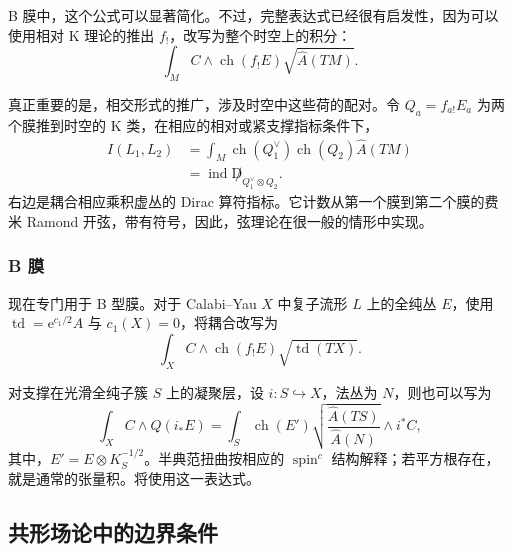 B 膜中，这个公式可以显著简化。不过，完整表达式已经很有启发性，因为可以使用相对 K 理论的推出 $f_!$，改写为整个时空上的积分：
\begin{equation}\label{eq:5.9}
\int_MC\wedge\operatorname{ch}(f_!E)\sqrt{\widehat A(TM)}.
\end{equation}

真正重要的是，相交形式的推广，涉及时空中这些荷的配对。令 $Q_a=f_{a!}E_a$ 为两个膜推到时空的 K 类，在相应的相对或紧支撑指标条件下，
\begin{equation}\label{eq:5.10}
\begin{aligned}
I(L_1,L_2)
&=\int_M\operatorname{ch}(Q_1^{\vee})
\operatorname{ch}(Q_2)\widehat A(TM)\\
&=\operatorname{ind}\not D_{Q_1^{\vee}\otimes Q_2}.
\end{aligned}
\end{equation}
右边是耦合相应乘积虚丛的 Dirac 算符指标。它计数从第一个膜到第二个膜的费米 Ramond 开弦，带有符号，因此，弦理论在很一般的情形中实现。

\subsubsection{B 膜}\label{sec:5.1.4.1}

现在专门用于 B 型膜。对于 Calabi--Yau $X$ 中复子流形 $L$ 上的全纯丛 $E$，使用 $\operatorname{td}=\mathrm{e}^{c_1/2}\widehat A$ 与 $c_1(X)=0$，将耦合改写为
\begin{equation}\label{eq:5.11}
\int_XC\wedge\operatorname{ch}(f_!E)\sqrt{\operatorname{td}(TX)}.
\end{equation}

对支撑在光滑全纯子簇 $S$ 上的凝聚层，设 $i\colon S\hookrightarrow X$，法丛为 $N$，则也可以写为
\begin{equation}\label{eq:5.12}
\int_XC\wedge Q(i_*E)
=\int_S\operatorname{ch}(E')
\sqrt{\frac{\widehat A(TS)}{\widehat A(N)}}\wedge i^*C,
\end{equation}
其中，$E'=E\otimes K_S^{-1/2}$。半典范扭曲按相应的 $\operatorname{spin}^c$ 结构解释；若平方根存在，就是通常的张量积。将使用这一表达式。

\subsection{共形场论中的边界条件}\label{sec:5.1.5}


